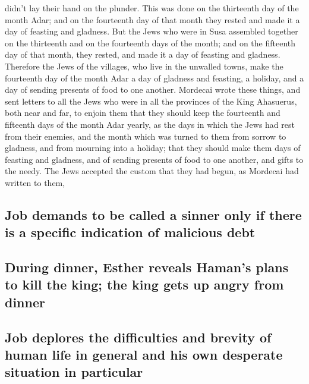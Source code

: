 didn't lay their hand on the plunder.  This was done on
the thirteenth day of the month Adar; and on the fourteenth day of that
month they rested and made it a day of feasting and gladness.
 But the Jews who were in Susa assembled together on the
thirteenth and on the fourteenth days of the month; and on the fifteenth
day of that month, they rested, and made it a day of feasting and
gladness.  Therefore the Jews of the villages, who live
in the unwalled towns, make the fourteenth day of the month Adar a day
of gladness and feasting, a holiday, and a day of sending presents of
food to one another.  Mordecai wrote these things, and
sent letters to all the Jews who were in all the provinces of the King
Ahasuerus, both near and far,  to enjoin them that they
should keep the fourteenth and fifteenth days of the month Adar yearly,
 as the days in which the Jews had rest from their
enemies, and the month which was turned to them from sorrow to gladness,
and from mourning into a holiday; that they should make them days of
feasting and gladness, and of sending presents of food to one another,
and gifts to the needy.  The Jews accepted the custom
that they had begun, as Mordecai had written to them,

\hypertarget{job-demands-to-be-called-a-sinner-only-if-there-is-a-specific-indication-of-malicious-debt}{%
\subsection{Job demands to be called a sinner only if there is a
specific indication of malicious
debt}\label{job-demands-to-be-called-a-sinner-only-if-there-is-a-specific-indication-of-malicious-debt}}

\hypertarget{during-dinner-esther-reveals-hamans-plans-to-kill-the-king-the-king-gets-up-angry-from-dinner}{%
\subsection{During dinner, Esther reveals Haman's plans to kill the
king; the king gets up angry from
dinner}\label{during-dinner-esther-reveals-hamans-plans-to-kill-the-king-the-king-gets-up-angry-from-dinner}}

\hypertarget{job-deplores-the-difficulties-and-brevity-of-human-life-in-general-and-his-own-desperate-situation-in-particular}{%
\subsection{Job deplores the difficulties and brevity of human life in
general and his own desperate situation in
particular}\label{job-deplores-the-difficulties-and-brevity-of-human-life-in-general-and-his-own-desperate-situation-in-particular}}

